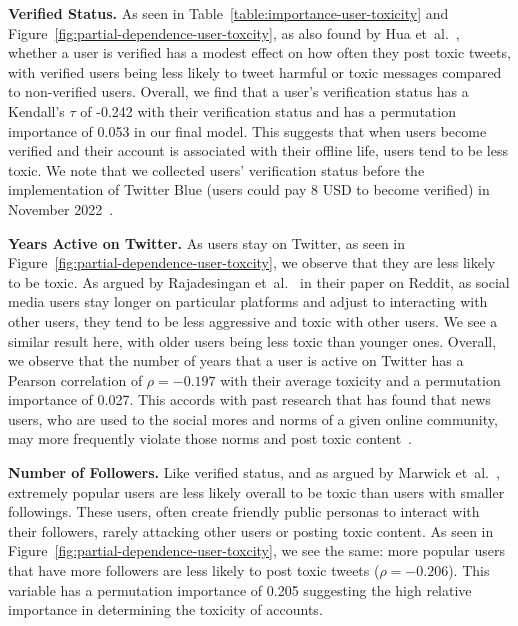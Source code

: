 \vspace{2pt}\noindent
\noindent
\textbf{Verified Status.} As seen in Table~\ref{table:importance-user-toxicity} and Figure~\ref{fig:partial-dependence-user-toxcity}, as also found by Hua {et~al.}~\cite{hua2020characterizing}, whether a user is verified has a modest effect on how often they post toxic tweets, with verified users being less likely to tweet harmful or toxic messages compared to non-verified users. Overall, we find that a user's verification status has a Kendall's $\tau$ of -0.242 with their verification status and has a permutation importance of 0.053 in our final model. This suggests that when users become verified and their account is associated with their offline life, users tend to be less toxic. We note that we collected users' verification status before the implementation of Twitter Blue (users could pay 8 USD to become verified) in November 2022~\cite{Fung2023}.

\vspace{2pt}\noindent
\noindent
\textbf{Years Active on Twitter.} As users stay on Twitter, as seen in Figure~\ref{fig:partial-dependence-user-toxcity}, we observe that they are less likely to be toxic. As argued by Rajadesingan {et~al.}~\cite{rajadesingan2020quick} in their paper on Reddit, as social media users stay longer on particular platforms and adjust to interacting with other users, they tend to be less aggressive and toxic with other users. We see a similar result here, with older users being less toxic than younger ones. Overall, we observe that the number of years that a user is active on Twitter has a Pearson correlation of $\rho=-0.197$ with their average toxicity and a permutation importance of 0.027. This accords with past research that has found that news users, who are used to the social mores and norms of a given online community, may more frequently violate those norms and post toxic content~\cite{kraut2010dealing}.

\vspace{2pt}\noindent
\noindent
\textbf{Number of Followers.} Like verified status, and as argued by Marwick {et~al.}~\cite{marwick2011see}, extremely popular users are less likely overall to be toxic than users with smaller followings. These users, often create friendly public personas to interact with their followers, rarely attacking other users or posting toxic content. As seen in Figure~\ref{fig:partial-dependence-user-toxcity}, we see the same: more popular users that have more followers are less likely to post toxic tweets ($\rho=-0.206$). This variable has a permutation importance of 0.205 suggesting the high relative importance in determining the toxicity of accounts. 


